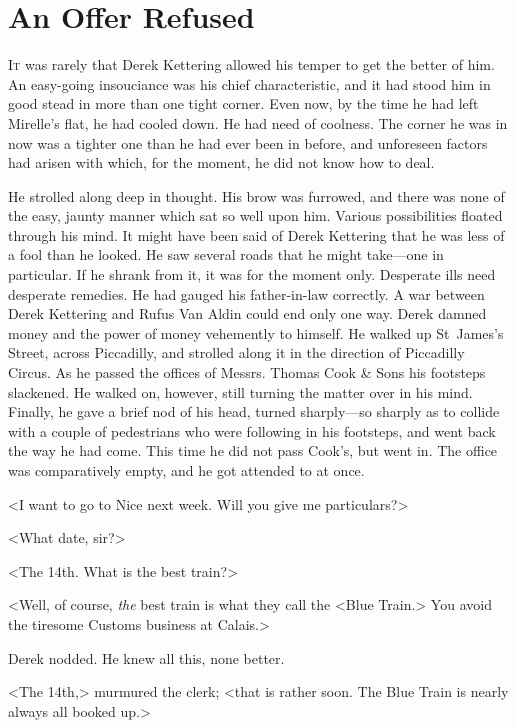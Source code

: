 \chapter{An Offer Refused}



\lettrine{I}{t} was rarely that Derek Kettering allowed his temper to get the better of him. An easy-going insouciance was his chief characteristic, and it had stood him in good stead in more than one tight corner. Even now, by the time he had left Mirelle's flat, he had cooled down. He had need of coolness. The corner he was in now was a tighter one than he had ever been in before, and unforeseen factors had arisen with which, for the moment, he did not know how to deal.

He strolled along deep in thought. His brow was furrowed, and there was none of the easy, jaunty manner which sat so well upon him. Various possibilities floated through his mind. It might have been said of Derek Kettering that he was less of a fool than he looked. He saw several roads that he might take—one in particular. If he shrank from it, it was for the moment only. Desperate ills need desperate remedies. He had gauged his father-in-law correctly. A war between Derek Kettering and Rufus Van Aldin could end only one way. Derek damned money and the power of money vehemently to himself. He walked up St~James's Street, across Piccadilly, and strolled along it in the direction of Piccadilly Circus. As he passed the offices of Messrs. Thomas Cook \& Sons his footsteps slackened. He walked on, however, still turning the matter over in his mind. Finally, he gave a brief nod of his head, turned sharply—so sharply as to collide with a couple of pedestrians who were following in his footsteps, and went back the way he had come. This time he did not pass Cook's, but went in. The office was comparatively empty, and he got attended to at once.

<I want to go to Nice next week. Will you give me particulars?>

<What date, sir?>

<The 14th. What is the best train?>

<Well, of course, \emph{the} best train is what they call the <Blue Train.> You avoid the tiresome Customs business at Calais.>

Derek nodded. He knew all this, none better.

<The 14th,> murmured the clerk; <that is rather soon. The Blue Train is nearly always all booked up.>

